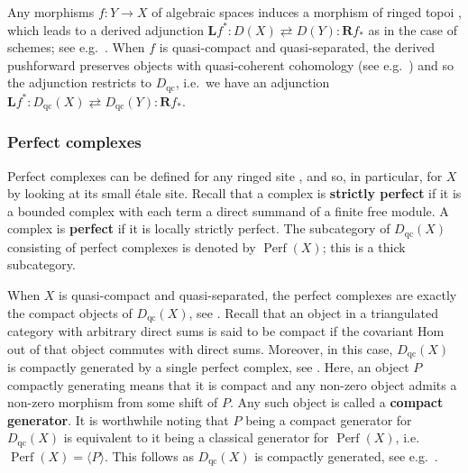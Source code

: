 \documentclass[11pt]{amsart}
\theoremstyle{plain}
\theoremstyle{definition}
\numberwithin{equation}{section}
\numberwithin{theorem}{section}
\begin{document}
Any morphisms $f\colon Y \to X$ of algebraic spaces induces a morphism of ringed topoi \cite[\href{https://stacks.math.columbia.edu/tag/03G8}{Tag 03G8}]{StacksProject}, which leads to a derived adjunction $\mathbf{L}f^\ast \colon D(X)\rightleftarrows D(Y) \colon \mathbf{R}f_\ast$ as in the case of schemes; see e.g.\ \cite[\href{https://stacks.math.columbia.edu/tag/07A6}{Tag 07A6}]{StacksProject}. 
When $f$ is quasi-compact and quasi-separated, the derived pushforward preserves objects with quasi-coherent cohomology (see e.g.\ \cite[\href{https://stacks.math.columbia.edu/tag/08FA}{Tag 08FA}]{StacksProject}) and so the adjunction restricts to $D_{\operatorname{qc}}$, i.e.\ we have an adjunction $\mathbf{L}f^\ast \colon D_{\operatorname{qc}}(X)\rightleftarrows D_{\operatorname{qc}}(Y) \colon \mathbf{R}f_\ast$. 

\subsubsection{Perfect complexes}
\label{sec:prelim_spaces_perfect}

Perfect complexes can be defined for any ringed site \cite[\href{https://stacks.math.columbia.edu/tag/08G4}{Tag 08G4}]{StacksProject}, and so, in particular, for $X$ by looking at its small \'{e}tale site.
Recall that a complex is \textbf{strictly perfect} if it is a bounded complex with each term a  direct summand of a finite free module.
A complex is \textbf{perfect} if it is locally strictly perfect. 
The subcategory of $D_{\operatorname{qc}}(X)$ consisting of perfect complexes is denoted by $\operatorname{Perf}(X)$; this is a thick subcategory. 

When $X$ is quasi-compact and quasi-separated, the perfect complexes are exactly the compact objects of $D_{\operatorname{qc}}(X)$, see \cite[\href{https://stacks.math.columbia.edu/tag/09M8}{Tag 09M8}]{StacksProject}. Recall that an object in a triangulated category with arbitrary direct sums is said to be compact if the covariant Hom out of that object commutes with direct sums. 
Moreover, in this case, $D_{\operatorname{qc}}(X)$ is compactly generated by a single perfect complex, see \cite[\href{https://stacks.math.columbia.edu/tag/0AEC}{Tag 0AEC}]{StacksProject}. 
Here, an object $P$ compactly generating means that it is compact and any non-zero object admits a non-zero morphism from some shift of $P$. Any such object is called a \textbf{compact generator}. 
It is worthwhile noting that $P$ being a compact generator for $D_{\operatorname{qc}}(X)$ is equivalent to it being a classical generator for $\operatorname{Perf}(X)$, i.e.\  $\operatorname{Perf}(X) = \langle P \rangle$.
This follows as $D_{\operatorname{qc}}(X)$ is compactly generated, see e.g.\ \cite[\href{https://stacks.math.columbia.edu/tag/09SR}{Tag 09SR}]{StacksProject}.
\end{document}
